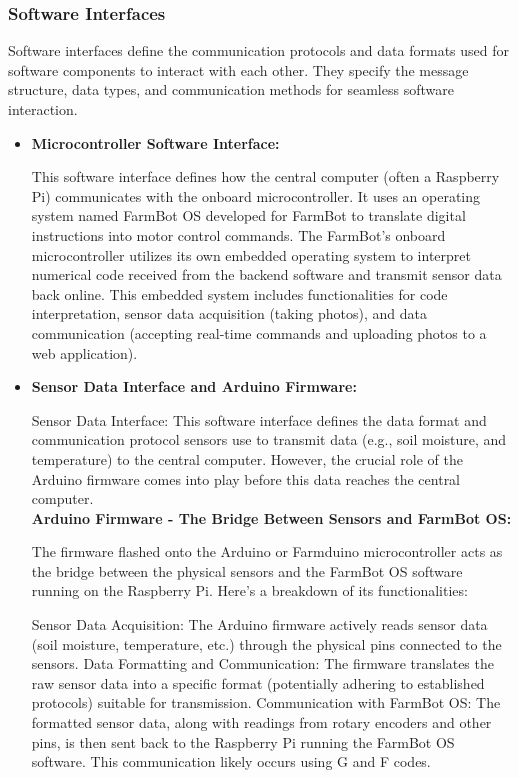 \subsubsection{Software Interfaces}
Software interfaces define the communication protocols and data formats used for software components to interact with each other. They specify the message structure, data types, and communication methods for seamless software interaction.
\begin{itemize}
    \item \textbf{Microcontroller Software Interface:}
    
    This software interface defines how the central computer (often a Raspberry Pi) communicates with the onboard microcontroller. It uses an operating system named FarmBot OS developed for FarmBot to translate digital instructions into motor control commands. The FarmBot's onboard microcontroller utilizes its own embedded operating system to interpret numerical code received from the backend software and transmit sensor data back online. This embedded system includes functionalities for code interpretation, sensor data acquisition (taking photos), and data communication (accepting real-time commands and uploading photos to a web application).
    \item \textbf{Sensor Data Interface and Arduino Firmware:}

    Sensor Data Interface: This software interface defines the data format and communication protocol sensors use to transmit data (e.g., soil moisture, and temperature) to the central computer. However, the crucial role of the Arduino firmware comes into play before this data reaches the central computer.\\
    \textbf{Arduino Firmware - The Bridge Between Sensors and FarmBot OS:}
    
    The firmware flashed onto the Arduino or Farmduino microcontroller acts as the bridge between the physical sensors and the FarmBot OS software running on the Raspberry Pi. Here's a breakdown of its functionalities:
    
    Sensor Data Acquisition: The Arduino firmware actively reads sensor data (soil moisture, temperature, etc.) through the physical pins connected to the sensors.
    Data Formatting and Communication: The firmware translates the raw sensor data into a specific format (potentially adhering to established protocols) suitable for transmission.
    Communication with FarmBot OS: The formatted sensor data, along with readings from rotary encoders and other pins, is then sent back to the Raspberry Pi running the FarmBot OS software. This communication likely occurs using G and F codes.


\end{itemize}
